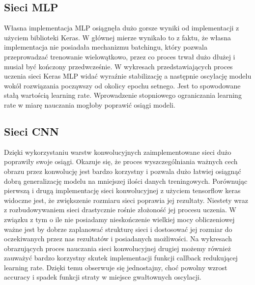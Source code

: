 \documentclass{article}
\begin{document}
\subsection*{Sieci MLP}
Własna implementacja MLP osiągnęła dużo gorsze wyniki od 
implementacji z użyciem biblioteki Keras. W głównej 
mierze wynikało to z faktu, że własna implementacja nie 
posiadała mechanizmu batchingu, który pozwala przeprowadzać 
trenowanie wielowątkowo, przez co proces trwał dużo dłużej i 
musiał być kończony przedwcześnie. W wykresach przedstawiających 
proces uczenia sieci Keras MLP widać wyraźnie stabilizację a 
następnie oscylację modelu wokół rozwiązania począwszy od okolicy 
epochu setnego. Jest to spowodowane stałą wartością learning rate. 
Wprowadzenie stopniowego ograniczania learning rate w miarę nauczania 
mogłoby poprawić osiągi modeli.

\subsection*{Sieci CNN}
Dzięki wykorzystaniu warstw konwolucyjnych zaimplementowane sieci 
dużo poprawiły swoje osiągi. Okazuje się, że proces wyszczególniania 
ważnych cech obrazu przez konwolucję jest bardzo korzystny i pozwala 
dużo łatwiej osiągnąć dobrą generalizację modelu na mniejszej ilości 
danych treningowych. Porównując pierwszą i drugą implementację sieci 
konwolucyjnej z użyciem tensorflow keras widoczne jest, że zwiększenie 
rozmiaru sieci poprawia jej rezultaty. Niestety wraz z rozbudowywaniem 
sieci drastycznie rośnie złożoność jej procesu uczenia. W związku z tym 
o ile nie posiadamy nieskończenie wielkiej mocy obliczeniowej ważne jest 
by dobrze zaplanować strukturę sieci i dostosować jej rozmiar do 
oczekiwanych przez nas rezultatów i posiadanych możliwości. Na wykresach 
obrazujących proces nauczania sieci konwolucyjnej drugiej możemy również 
zauważyć bardzo korzystny skutek implementacji funkcji callback redukującej 
learning rate. Dzięki temu obserwuje się jednostajny, choć powolny wzrost 
accuracy i spadek funkcji straty w miejsce gwałtownych oscylacji.
\end{document}
